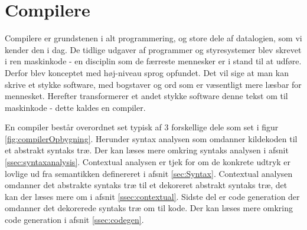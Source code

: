 \section{Compilere}
Compilere er grundstenen i alt programmering, og store dele af datalogien, som vi kender den i dag. De tidlige udgaver af programmer og styresystemer blev skrevet i ren maskinkode - en disciplin som de færreste mennesker er i stand til at udføre. Derfor blev konceptet med høj-niveau sprog opfundet. Det vil sige at man kan skrive et stykke software, med bogstaver og ord som er væsentligt mere læsbar for mennesket. Herefter transformerer et andet stykke software denne tekst om til maskinkode - dette kaldes en compiler.

En compiler består overordnet set typisk af 3 forskellige dele som set i figur \ref{fig:compilerOpbygning}. Herunder syntax analysen som omdanner kildekoden til et abstrakt syntaks træ. Der kan læses mere omkring syntaks analysen i afsnit \ref{ssec:syntaxanalysis}. Contextual analysen er tjek for om de konkrete udtryk er lovlige ud fra semantikken definereret i afsnit \ref{sec:Syntax}. Contextual analysen omdanner det abstrakte syntaks træ til et dekoreret abstrakt syntaks træ, det kan der læses mere om i afsnit \ref{ssec:contextual}. Sidste del er code generation der omdanner det dekorerede syntaks træ om til kode. Der kan læses mere omkring code generation i afsnit \ref{ssec:codegen}.

